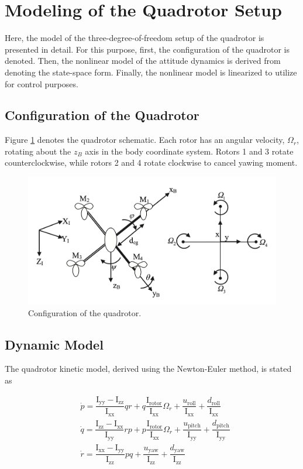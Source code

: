 \documentclass[3p,times]{elsarticle}
\begin{document}
\section{Modeling of the Quadrotor Setup}\label{sec:modeling}
Here, the model of the three-degree-of-freedom setup of the quadrotor is presented in detail. For this purpose, first, the configuration of the quadrotor is denoted. Then, the nonlinear model of the attitude dynamics is derived from denoting the state-space form. Finally, the nonlinear model is linearized to utilize for control purposes.
\subsection{Configuration of the Quadrotor}
Figure \ref{fig:schematic} denotes the quadrotor schematic. Each rotor has an angular velocity, $\Omega_r$, rotating about the $z_B$ axis in the body coordinate system. Rotors 1 and 3 rotate counterclockwise, while rotors 2 and 4 rotate clockwise to cancel yawing moment.

\begin{figure}[!h]
    \centering
    \includegraphics[width=12cm]{../Figure/schematic.png}
    \caption{Configuration of the quadrotor.}
    \label{fig:schematic}
\end{figure}

\subsection{Dynamic Model}
The quadrotor kinetic model, derived using the Newton-Euler method, is stated as \cite{4399042, article_Bouabdallah}



\begin{align}
    &\dot p = \dfrac{\mathrm{I}_{\text{yy}} - \mathrm{I}_{\text{zz}}}{\mathrm{I}_{\text{xx}}} qr + q \dfrac{\mathrm{I}_{\text{rotor}}}{\mathrm{I}_{\text{xx}}}\Omega_r + \dfrac{u_{\text{roll}}}{\mathrm{I}_{\text{xx}}} + \dfrac{d_{\text{roll}}}{\mathrm{I}_{\text{xx}}}
    \\
&\dot q = \dfrac{\mathrm{I}_{\text{zz}} - \mathrm{I}_{\text{xx}}}{\mathrm{I}_{\text{yy}}} rp + p \dfrac{\mathrm{I}_{\text{rotor}}}{\mathrm{I}_{\text{xx}}}\Omega_r + \dfrac{u_{\text{pitch}}}{\mathrm{I}_{\text{yy}}} + \dfrac{d_{\text{pitch}}}{\mathrm{I}_{\text{yy}}}
\\
&\dot r = \dfrac{\mathrm{I}_{\text{xx}} - \mathrm{I}_{\text{yy}}}{\mathrm{I}_{\text{zz}}} pq  +  \dfrac{u_{\text{yaw}}}{\mathrm{I}_{\text{zz}}} + \dfrac{d_{\text{yaw}}}{\mathrm{I}_{\text{zz}}}
\end{align}
\end{document}
